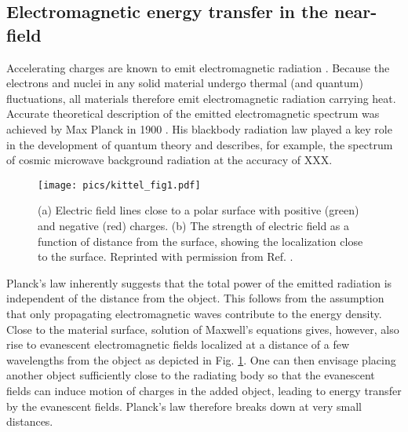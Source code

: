 

\subsection{Electromagnetic energy transfer in the near-field}
\label{sec:intro_em}
Accelerating charges are known to emit electromagnetic radiation \cite{jackson}. Because the electrons and nuclei in any solid material undergo thermal (and quantum) fluctuations, all materials therefore emit electromagnetic radiation carrying heat. Accurate theoretical description of the emitted electromagnetic spectrum was achieved by Max Planck in 1900 \cite{planck00a}. His blackbody radiation law played a key role in the development of quantum theory and describes, for example, the spectrum of cosmic microwave background radiation at the accuracy of XXX.


\begin{figure}
\begin{center}
 \texttt{[image: pics/kittel\_fig1.pdf]}
 \caption{(a) Electric field lines close to a polar surface with positive (green) and negative (red) charges. (b) The strength of electric field as a function of distance from the surface, showing the localization close to the surface. Reprinted with permission from Ref. \cite{kittel09}.}
\label{fig:intro_kittel}
\end{center}
\end{figure}
% 

Planck's law inherently suggests that the total power of the emitted radiation is independent of the distance from the object. This follows from the assumption that only propagating electromagnetic waves contribute to the energy density. Close to the material surface, solution of Maxwell's equations gives, however, also rise to evanescent electromagnetic fields localized at a distance of a few wavelengths from the object \cite{polder71} as depicted in Fig. \ref{fig:intro_kittel}. One can then envisage placing another object sufficiently close to the radiating body so that the evanescent fields can induce motion of charges in the added object, leading to energy transfer by the evanescent fields. Planck's law therefore breaks down at very small distances. 

